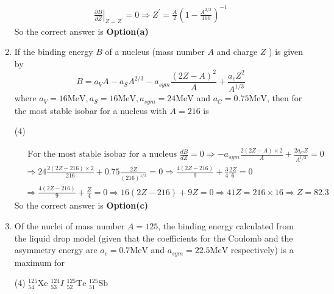 \begin{enumerate}
\begin{tasks}
	\end{tasks}
	\begin{answer}
		\begin{align*}
		\left.\frac{\partial B}{\partial Z}\right|_{Z=Z^{\prime}}=0 \Rightarrow Z^{\prime}=\frac{A}{2}\left(1-\frac{A^{2 / 3}}{160}\right)^{-1}
		\end{align*}
		So the correct answer is \textbf{Option(a)}
	\end{answer}
	\item  If the binding energy $B$ of a nucleus (mass number $A$ and charge $Z$ ) is given by
	$$
	B=a_V A-a_S A^{2 / 3}-a_{s y m} \frac{(2 Z-A)^2}{A}+\frac{a_c Z^2}{A^{1 / 3}}
	$$
	where $a_V=16 \mathrm{MeV}, a_S=16 \mathrm{MeV}, a_{s y m}=24 \mathrm{MeV}$ and $a_C=0.75 \mathrm{MeV}$, then for the most stable isobar for a nucleus with $A=216$ is
	{}
	\begin{tasks}(4)
	\end{tasks}
	\begin{answer}
		\begin{align*}
		&\text{ For the most stable isobar for a nucleus }\frac{d B}{d Z}=0 \Rightarrow-a_{s y m} \frac{2(2 Z-A) \times 2}{A}+\frac{2 a_C Z}{A^{1 / 3}}=0\\
		&\Rightarrow 24 \frac{2(2 Z-216) \times 2}{216}+0.75 \frac{2 Z}{(216)^{1 / 3}}=0 \Rightarrow \frac{4(2 Z-216)}{9}+\frac{3}{4} \frac{2 Z}{6}=0 \\
		&\Rightarrow \frac{4(2 Z-216)}{9}+\frac{Z}{4}=0 \Rightarrow 16(2 Z-216)+9 Z=0 \Rightarrow 41 Z=216 \times 16 \Rightarrow Z=82.3
		\end{align*}
		So the correct answer is \textbf{Option(c)}
	\end{answer}
	\item  Of the nuclei of mass number $A=125$, the binding energy calculated from the liquid drop model (given that the coefficients for the Coulomb and the asymmetry energy are $a_c=0.7 \mathrm{MeV}$ and $a_{s y m}=22.5 \mathrm{MeV}$ respectively) is a maximum for
	{}
	\begin{tasks}(4)
		\task[\textbf{a.}]${ }_{54}^{125} \mathrm{Xe}$
		\task[\textbf{b.}]${ }_{53}^{124} I$
		\task[\textbf{c.}]${ }_{52}^{125} \mathrm{Te}$
		\task[\textbf{d.}]  ${ }_{51}^{125} \mathrm{Sb}$
	\end{tasks}
	\begin{answer}
		\begin{align*}

\end{align*}
\end{answer}
\end{enumerate}
